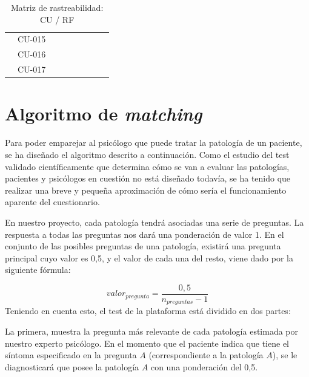 \begin{table}[htpb]
\begin{tabularx}{\textwidth}{|l|X|X|X|X|X|X|X|X|}
                         & CU-015       &        &        &        &        &        &        &        \\ \cline{2-9} 
                         & CU-016       &        &        &        &        &        &        &        \\ \cline{2-9}
                         & CU-017       &        &        &        &        &        &        &        \\ \hline
\end{tabularx}
\caption{Matriz de rastreabilidad: CU / RF}
\label{mat_rast_cu_rf}
\end{table}


\section{Algoritmo de \textit{matching}}


Para poder emparejar al psicólogo que puede tratar la patología de un paciente, se ha diseñado el algoritmo descrito a continuación. Como el estudio del test validado científicamente que determina cómo se van a evaluar las patologías, pacientes y psicólogos en cuestión no está diseñado todavía, se ha tenido que realizar una breve y pequeña aproximación de cómo sería el funcionamiento aparente del cuestionario.


En nuestro proyecto, cada patología tendrá asociadas una serie de preguntas. La respuesta a todas las preguntas nos dará una ponderación de valor 1. En el conjunto de las posibles preguntas de una patología, existirá una pregunta principal cuyo valor es 0,5, y el valor de cada una del resto, viene dado por la siguiente fórmula:

\begin{equation}
valor_{pregunta} = \frac{0,5}{n_{preguntas}-1}
\label{mi_ecuacion}
\end{equation}
%
%
%
%
Teniendo en cuenta esto, el test de la plataforma está dividido en dos partes:


La primera, muestra la pregunta más relevante de cada patología estimada por nuestro experto psicólogo. En el momento que el paciente indica que tiene el síntoma especificado en la pregunta $A$ (correspondiente a la patología $A$), se le diagnosticará que posee la patología $A$ con una ponderación del 0,5.


